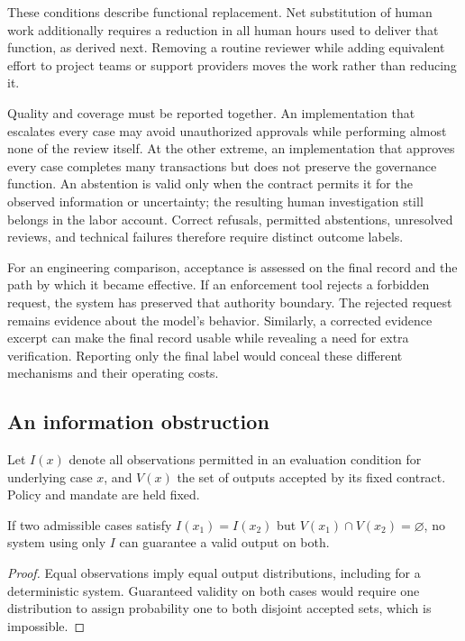 These conditions describe functional replacement. Net substitution of human work additionally
requires a reduction in all human hours used to deliver that function, as derived next. Removing
a routine reviewer while adding equivalent effort to project teams or support providers moves
the work rather than reducing it.

Quality and coverage must be reported together. An implementation that escalates every case
may avoid unauthorized approvals while performing almost none of the review itself. At the
other extreme, an implementation that approves every case completes many transactions but
does not preserve the governance function. An abstention is valid only when the contract
permits it for the observed information or uncertainty; the resulting human investigation
still belongs in the labor account. Correct refusals, permitted abstentions, unresolved
reviews, and technical failures therefore require distinct outcome labels.

For an engineering comparison, acceptance is assessed on the final record and the path by
which it became effective. If an enforcement tool rejects a forbidden request, the system
has preserved that authority boundary. The rejected request remains evidence about the
model's behavior. Similarly, a corrected evidence excerpt can make the final record usable
while revealing a need for extra verification. Reporting only the final label would conceal
these different mechanisms and their operating costs.

\subsection{An information obstruction}

Let $I(x)$ denote all observations permitted in an evaluation condition for underlying case $x$,
and $V(x)$ the set of outputs accepted by its fixed contract. Policy and mandate are held fixed.

\begin{proposition}
If two admissible cases satisfy $I(x_1)=I(x_2)$ but
$V(x_1)\cap V(x_2)=\varnothing$, no system using only $I$ can guarantee a valid output on both.
\end{proposition}
\begin{proof}
Equal observations imply equal output distributions, including for a deterministic system.
Guaranteed validity on both cases would require one distribution to assign probability one
to both disjoint accepted sets, which is impossible.
\end{proof}

